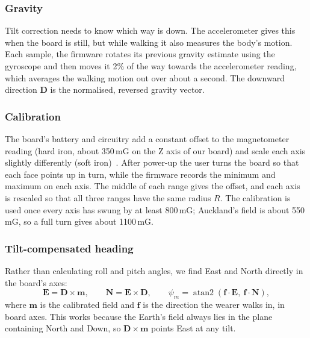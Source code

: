 \documentclass[conference,a4paper]{IEEEtran}
\begin{document}
\subsubsection{Gravity}
Tilt correction needs to know which way is down. The accelerometer gives this when the board is
still, but while walking it also measures the body's motion. Each sample, the firmware rotates
its previous gravity estimate using the gyroscope and then moves it 2\% of the way towards the
accelerometer reading, which averages the walking motion out over about a second. The downward
direction $\mathbf{D}$ is the normalised, reversed gravity vector.

\subsubsection{Calibration}
The board's battery and circuitry add a constant offset to the magnetometer reading (hard iron,
about 350\,mG on the Z axis of our board) and scale each axis slightly differently (soft
iron)~\cite{an4825}. After power-up the user turns the board so that each face points up in
turn, while the firmware records the minimum and maximum on each axis. The middle of each range
gives the offset, and each axis is rescaled so that all three ranges have the same radius $R$.
The calibration is used once every axis has swung by at least 800\,mG; Auckland's field is
about 550\,mG, so a full turn gives about 1100\,mG.

\subsubsection{Tilt-compensated heading}
Rather than calculating roll and pitch angles, we find East and North directly in the board's
axes:
\begin{equation}
\mathbf{E}=\mathbf{D}\times\mathbf{m},\qquad \mathbf{N}=\mathbf{E}\times\mathbf{D},\qquad
\psi_m=\operatorname{atan2}(\mathbf{f}\cdot\mathbf{E},\ \mathbf{f}\cdot\mathbf{N}),
\end{equation}
where $\mathbf{m}$ is the calibrated field and $\mathbf{f}$ is the direction the wearer walks
in, in board axes. This works because the Earth's field always lies in the plane containing
North and Down, so $\mathbf{D}\times\mathbf{m}$ points East at any tilt.
\end{document}
